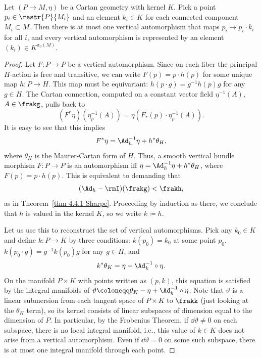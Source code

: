 \begin{thm}
    Let $(P\to M,\eta)$ be a Cartan geometry with kernel $K$. Pick a point $p_i\in \restr{P}{M_i}$ and an element $k_i\in K$ for each connected component $M_i\subset M$. Then there is at most one vertical automorphism that maps $p_i\mapsto p_i\cdot k_i$ for all $i$, and every vertical automorphism is represented by an element $(k_i)\in K^{\pi_0(M)}$.
\end{thm}
\begin{proof}
    Let $F:P\to P$ be a vertical automorphism. Since on each fiber the principal $H$-action is free and transitive, we can write $F(p)=p\cdot h(p)$ for some unique map $h:P\to H$. This map must be equivariant: $h(p\cdot g)=g^{-1}h(p)g$ for any $g\in H$. The Cartan connection, computed on a constant vector field $\eta^{-1}(A)$, $A\in\frakg$, pulls back to 
    \[(F^\ast \eta)(\eta^{-1}_p(A))=\eta(F_\ast(p)\cdot \eta^{-1}_p(A)).\]
    It is easy to see that this implies
    \[F^\ast\eta=\Ad_h^{-1}\eta+h^\ast \theta_H,\]
    where $\theta_H$ is the Maurer-Cartan form of $H$. Thus, a smooth vertical bundle morphism $F:P\to P$ is an automorphism iff $\eta=\Ad_h^{-1}\eta+h^\ast\theta_H$, where $F(p)=p\cdot h(p)$. This is equivalent to demanding that 
    \[(\Ad_h-\rmI)(\frakg)<\frakh,\]
    as in Theorem~\ref{thm 4.4.1 Sharpe}. Proceeding by induction as there, we conclude that $h$ is valued in the kernel $K$, so we write $k\coloneqq h$. 

    Let us use this to reconstruct the set of vertical automorphisms. Pick any $k_0\in K$ and define $k:P\to K$ by three conditions: $k(p_0)=k_0$ at some point $p_0$, $k(p_0\cdot g)=g^{-1}k(p_0)g$ for any $g\in H$, and 
    \[k^\ast\theta_K=\eta-\Ad_k^{-1}\circ\eta.\]
    On the manifold $P\times K$ with points written as $(p,k)$, this equation is satisfied by the integral manifolds of $\vartheta\coloneqq \theta_K-\eta+\Ad_k^{-1}\circ \eta$. Note that $\vartheta$ is a linear submersion from each tangent space of $P\times K$ to $\frakk$ (just looking at the $\theta_K $ term), so its kernel consists of linear subspaces of dimension equal to the dimension of $P$. In particular, by the Frobenius Theorem, if $\dd\vartheta\neq 0$ on each subspace, there is no local integral manifold, i.e., this value of $k\in K$ does not arise from a vertical automorphism. Even if $\dd\vartheta=0$ on some such subspace, there is at most one integral manifold through each point.
\end{proof}


